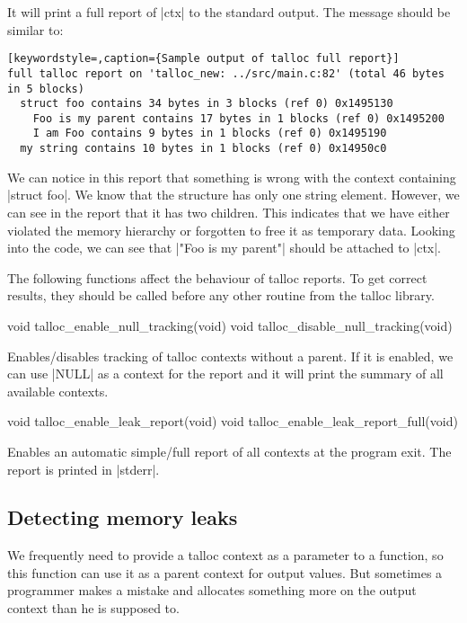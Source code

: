 \noindent
It will print a full report of |ctx| to the standard output. The message should
be similar to:

\begin{lstlisting}[keywordstyle=,caption={Sample output of talloc full report}]
full talloc report on 'talloc_new: ../src/main.c:82' (total 46 bytes in 5 blocks)
  struct foo contains 34 bytes in 3 blocks (ref 0) 0x1495130
    Foo is my parent contains 17 bytes in 1 blocks (ref 0) 0x1495200
    I am Foo contains 9 bytes in 1 blocks (ref 0) 0x1495190
  my string contains 10 bytes in 1 blocks (ref 0) 0x14950c0
\end{lstlisting}

\noindent
We can notice in this report that something is wrong with the context containing
|struct foo|. We know that the structure has only one string element. However,
we can see in the report that it has two children. This indicates that we have
either violated the memory hierarchy or forgotten to free it as temporary data.
Looking into the code, we can see that |"Foo is my parent"| should be attached
to |ctx|.

The following functions affect the behaviour of talloc reports. To get correct
results, they should be called before any other routine from the talloc library.

\begin{funcproto}
void talloc_enable_null_tracking(void)
void talloc_disable_null_tracking(void)
\end{funcproto}
\begin{funcdesc}
Enables/disables tracking of talloc contexts without a parent. If it is enabled,
we can use |NULL| as a context for the report and it will print the summary of all
available contexts.
\end{funcdesc}

\begin{funcproto}
void talloc_enable_leak_report(void)
void talloc_enable_leak_report_full(void)
\end{funcproto}
\begin{funcdesc}
  Enables an automatic simple/full report of all contexts at the program exit.
  The report is printed in |stderr|.
\end{funcdesc}

\subsection{Detecting memory leaks}

We frequently need to provide a talloc context as a parameter to a function, so
this function can use it as a parent context for output values. But sometimes a
programmer makes a mistake and allocates something more on the output context
than he is supposed to.


